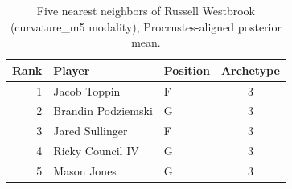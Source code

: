 \begin{table}[htbp]
  \centering\small
  \begin{tabular}{rllc}
    \toprule
    Rank & Player & Position & Archetype \\
    \midrule
    1 & Jacob Toppin & F & 3 \\
    2 & Brandin Podziemski & G & 3 \\
    3 & Jared Sullinger & F & 3 \\
    4 & Ricky Council IV & G & 3 \\
    5 & Mason Jones & G & 3 \\
    \bottomrule
  \end{tabular}
  \caption{Five nearest neighbors of Russell Westbrook (curvature_m5 modality), Procrustes-aligned posterior mean.}
  \label{tab:Russell_Westbrook_neighbors_curvature_m5}
\end{table}

